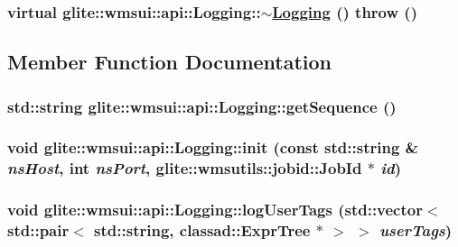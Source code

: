 \hypertarget{classglite_1_1wmsui_1_1api_1_1Logging_a1}{
\subsubsection[$\sim$Logging]{\setlength{\rightskip}{0pt plus 5cm}virtual glite::wmsui::api::Logging::$\sim$\hyperlink{classglite_1_1wmsui_1_1api_1_1Logging}{Logging} ()  throw ()}}
\label{classglite_1_1wmsui_1_1api_1_1Logging_a1}




\subsection{Member Function Documentation}
\hypertarget{classglite_1_1wmsui_1_1api_1_1Logging_a7}{
\subsubsection[getSequence]{\setlength{\rightskip}{0pt plus 5cm}std::string glite::wmsui::api::Logging::get\-Sequence ()}}
\label{classglite_1_1wmsui_1_1api_1_1Logging_a7}


\hypertarget{classglite_1_1wmsui_1_1api_1_1Logging_a2}{
\subsubsection[init]{\setlength{\rightskip}{0pt plus 5cm}void glite::wmsui::api::Logging::init (const std::string \& {\em ns\-Host}, int {\em ns\-Port}, glite::wmsutils::jobid::Job\-Id $\ast$ {\em id})}}
\label{classglite_1_1wmsui_1_1api_1_1Logging_a2}


\hypertarget{classglite_1_1wmsui_1_1api_1_1Logging_a9}{
\subsubsection[logUserTags]{\setlength{\rightskip}{0pt plus 5cm}void glite::wmsui::api::Logging::log\-User\-Tags (std::vector$<$ std::pair$<$ std::string, classad::Expr\-Tree $\ast$ $>$ $>$ {\em user\-Tags})}}
\label{classglite_1_1wmsui_1_1api_1_1Logging_a9}


